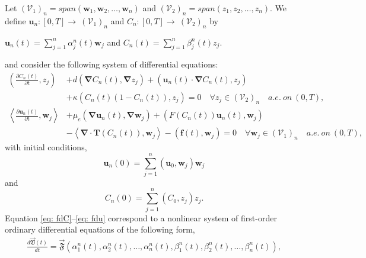 \documentclass[final,3p,times]{elsarticle}
\theoremstyle{plain}
\theoremstyle{remark}
\theoremstyle{plain}
\theoremstyle{remark}
\begin{document}
Let $\left(\mathscr V_1\right)_n = span\left(\mathbf{w}_1, \mathbf w_2, \dots, \mathbf w_n\right)$ and $\left(\mathscr V_2\right)_n = span\left(z_1, z_2, \dots, z_n \right)$. We define $\mathbf{u}_n:[0,T] \to \ \left(\mathscr V_1\right)_n$ and $C_n: [0,T] \to \ \left(\mathscr V_2\right)_n$ by 
\begin{center}
	$\mathbf{u}_n\left(t\right)=\sum_{j=1}^{n}\alpha_j^n\left(t\right)\mathbf w_j$ and $C_n\left(t\right)=\sum_{j=1}^{n}\beta_j^n\left(t\right)z_j$.
\end{center}
and consider the following system of differential equations:
\begin{align}
	\left(\frac{\partial C_n\left(t\right)}{\partial t},z_j\right) & + d\left(\boldsymbol{\nabla} C_n\left(t\right), \boldsymbol{\nabla} z_j\right)+\left(\mathbf{u}_n\left(t\right) \cdot \boldsymbol{\nabla} C_n\left(t\right),z_j\right)\nonumber \\ 
    & +\kappa \left(C_n\left(t\right)\left(1-C_n\left(t\right)\right),z_j\right) = 0 \quad \forall z_j \in \left(\mathscr V_2\right)_n \quad a.e. \ on \ \left(0,T\right), \label{eq: fdC} \\
	\left \langle  \frac{\partial \mathbf{u}_n\left(t\right)}{\partial t},\mathbf w_j \right \rangle & + \mu_e\left(\boldsymbol{\nabla} \mathbf{u}_n\left(t\right), \boldsymbol{\nabla} \mathbf w_j\right) + \left( F\left(C_n\left(t\right)\right)
 \mathbf{u}_n\left(t\right),\mathbf w_j\right) \nonumber \\ 
 & -\left \langle \boldsymbol{\nabla} \cdot \mathbf{T}\left(C_n\left(t\right)\right), \mathbf w_j \right \rangle - \left(\mathbf f\left(t\right),\mathbf w_j\right) = 0 \quad \forall \mathbf w_j \in \left(\mathscr V_1\right)_n \quad a.e. \ on \ \left(0,T\right)  \label{eq: fdu},
 \end{align} 
with initial conditions, 
\begin{equation}
    \mathbf{u}_n\left(0\right)=\sum_{j=1}^{n}\left(\mathbf{u}_0,\mathbf w_j\right)\mathbf w_j
\end{equation}
and 
\begin{equation}
    C_n\left(0\right)=\sum_{j=1}^{n}\left(C_0,{z_j}\right)z_j. 
\end{equation}
Equation \eqref{eq: fdC}--\eqref{eq: fdu} correspond to a nonlinear system of
ﬁrst-order ordinary differential equations of the following form,
\begin{align}
    \frac{d \vec{\mathfrak{V}}(t)}{dt}= \vec{\mathfrak{F}} \left(\alpha_1^n(t),\alpha_2^n(t),\dots,\alpha_n^n(t),\beta_1^n(t),\beta_2^n(t),\dots,\beta_n^n(t)\right),
\end{align}
\end{document}
